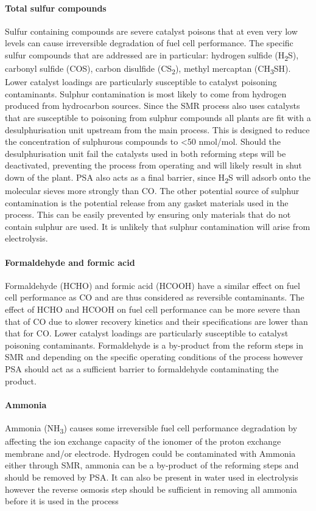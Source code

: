 \paragraph{Total sulfur compounds}
Sulfur containing compounds are severe catalyst poisons that at even very low levels can cause irreversible 
degradation of fuel cell performance. The specific sulfur compounds that are addressed are in particular: 
hydrogen sulfide (H\textsubscript{2}S), carbonyl sulfide (COS), carbon disulfide (CS\textsubscript{2}), methyl mercaptan (CH\textsubscript{3}SH). 
Lower catalyst loadings are particularly susceptible to catalyst poisoning contaminants.
Sulphur contamination is most likely to come from hydrogen produced from hydrocarbon sources. 
Since the SMR process also uses catalysts that are susceptible to poisoning from sulphur compounds all 
plants are fit with a desulphurisation unit upstream from the main process. 
This is designed to reduce the concentration of sulphurous compounds to <50 nmol/mol. 
Should the desulphurisation unit fail the catalysts used in both reforming steps will be deactivated, 
preventing the process from operating and will likely result in shut down of the plant. 
PSA also acts as a final barrier, since H\textsubscript{2}S will adsorb onto the molecular sieves more strongly than CO.
The other potential source of sulphur contamination is the potential release from any gasket materials 
used in the process. This can be easily prevented by ensuring only materials that do not contain sulphur are 
used. 
It is unlikely that sulphur contamination will arise from electrolysis. 

\paragraph{Formaldehyde and formic acid}
Formaldehyde (HCHO) and formic acid (HCOOH) have a similar effect on fuel cell performance as CO and are 
thus considered as reversible contaminants. The effect of HCHO and HCOOH on fuel cell performance can be 
more severe than that of CO due to slower recovery kinetics and their specifications are lower than that for CO. 
Lower catalyst loadings are particularly susceptible to catalyst poisoning contaminants.
Formaldehyde is a by-product from the reform steps in SMR and depending on the specific operating conditions 
of the process however PSA should act as a sufficient barrier to formaldehyde contaminating the product.
\paragraph{Ammonia}
Ammonia (NH\textsubscript{3}) causes some irreversible fuel cell performance degradation by affecting the ion exchange 
capacity of the ionomer of the proton exchange membrane and/or electrode.
Hydrogen could be contaminated with Ammonia either through SMR, ammonia can be a by-product of the reforming 
steps and should be removed by PSA. It can also be present in water used in electrolysis however the reverse 
osmosis step should be sufficient in removing all ammonia before it is used in the process 

